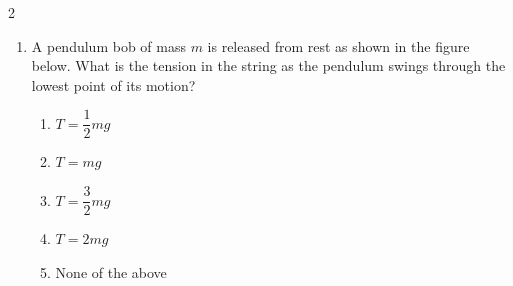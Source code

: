 {\begin{multicols*}{2}
\begin{enumerate}[leftmargin=12pt,itemsep=4pt]

    \item A pendulum bob of mass $m$ is released from rest as shown in the
      figure below. What is the tension in the string as the pendulum swings
      through the lowest point of its motion?
      \begin{center}
      \end{center}
      \begin{enumerate}
      \item $T=\dfrac12mg$
      \item $T=mg$
      \item $T=\dfrac32mg$
      \item $T=2mg$
      \item None of the above
      \end{enumerate}


\end{enumerate}
\end{multicols*}}
